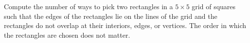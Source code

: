 Compute the number of ways to pick two rectangles in a $5 \times 5$ grid of squares such that the edges of the rectangles lie on the lines of the grid and the rectangles do not overlap at their interiors, edges, or vertices. The order in which the rectangles are chosen does not matter.